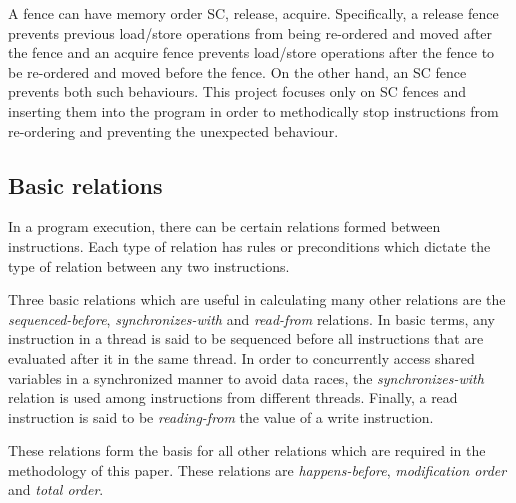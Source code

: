 \par
A fence can have memory order SC, release, acquire. Specifically, a release fence prevents previous load/store operations from being re-ordered and moved after the fence and an acquire fence prevents load/store operations after the fence to be re-ordered and moved before the fence. On the other hand, an SC fence prevents both such behaviours. This project focuses only on SC fences and inserting them into the program in order to methodically stop instructions from re-ordering and preventing the unexpected behaviour.

\subsection{Basic relations}
\par
In a program execution, there can be certain relations formed between instructions. Each type of relation has rules or preconditions which dictate the type of relation between any two instructions.

\par
Three basic relations which are useful in calculating many other relations are the \textit{sequenced-before}, \textit{synchronizes-with} and \textit{read-from} relations. In basic terms, any instruction in a thread is said to be sequenced before all instructions that are evaluated after it in the same thread. In order to concurrently access shared variables in a synchronized manner to avoid data races, the \textit{synchronizes-with} relation is used among instructions from different threads. Finally, a read instruction is said to be \textit{reading-from} the value of a write instruction.

These relations form the basis for all other relations which are required in the methodology of this paper. These relations are \textit{happens-before}, \textit{modification order} and \textit{total order}.

